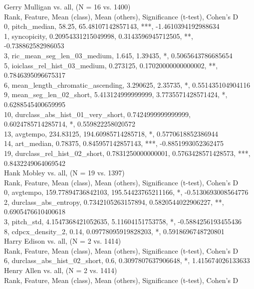 Gerry Mulligan vs. all, (N = 16 vs. 1400)\\
Rank, Feature, Mean (class), Mean (others), Significance (t-test), Cohen's D\\
0, pitch_median, 58.25, 65.48107142857143, ***, -1.4610394192988634\\
1, syncopicity, 0.20954331215049998, 0.3143596945712505, **, -0.738862582986053\\
3, ric_mean_seg_len_03_medium, 1.645, 1.39435, *, 0.5065643786685654\\
5, ioiclass_rel_hist_03_medium, 0.273125, 0.17020000000000002, **, 0.7846395096675317\\
6, mean_length_chromatic_ascending, 3.290625, 2.35735, *, 0.551435104904116\\
9, mean_seg_len_02_short, 5.413124999999999, 3.7735571428571424, *, 0.6288545400659995\\
10, durclass_abs_hist_01_very_short, 0.7424999999999999, 0.6024785714285714, *, 0.559822258020572\\
13, avgtempo, 234.83125, 194.60985714285718, *, 0.5770618852386944\\
14, art_median, 0.78375, 0.845957142857143, ***, -0.8851993052362475\\
19, durclass_rel_hist_02_short, 0.7831250000000001, 0.5763428571428573, ***, 0.8432249064069542\\
Hank Mobley vs. all, (N = 19 vs. 1397)\\
Rank, Feature, Mean (class), Mean (others), Significance (t-test), Cohen's D\\
0, avgtempo, 159.77894736842103, 195.54423765211166, *, -0.5130693008564776\\
2, durclass_abs_entropy, 0.7342105263157894, 0.5820544022906227, **, 0.6905476610400618\\
3, pitch_std, 4.1547368421052635, 5.11604151753758, *, -0.5884256193455436\\
8, cdpcx_density_2, 0.14, 0.09778095919828203, *, 0.5918696748720801\\
Harry Edison vs. all, (N = 2 vs. 1414)\\
Rank, Feature, Mean (class), Mean (others), Significance (t-test), Cohen's D\\
6, durclass_abs_hist_02_short, 0.6, 0.3097807637906648, *, 1.415674026133633\\
Henry Allen vs. all, (N = 2 vs. 1414)\\
Rank, Feature, Mean (class), Mean (others), Significance (t-test), Cohen's D\\

